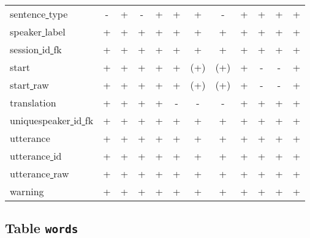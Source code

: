 \documentclass[a4paper, 11pt]{book}
\newcommand{\und}{\underline{{ }}\hspace{0.2mm}}	%
\begin{document}
\begin{longtable}{lccccccccccc}
	sentence\und type 			&  - 		& + 	& -  		& +  		 & + 	  & +  		& - 	 & +  		& + 	  & + 	 & +  \\
	speaker\und label 			&  + 		& + 	& +  		& +  		 & + 	  & +  		& + 	 & +  		& + 	  & + 	 & +  \\
	session\und id\und fk	 	&  + 		& + 	& +  		& +  		 & + 	  & +  		& + 	 & +  		& + 	  & + 	 & +  \\
	start		 				&  + 		& + 	& +  		& +  		 & + 	  & (+)  	& (+) 	 & +  		& - 	  & - 	 & +  \\
	start\und raw 				&  + 		& + 	& +  		& +  		 & + 	  & (+) 	& (+) 	 & +  		& - 	  & - 	 & +  \\
	translation					&  + 		& + 	& + 		& +  		 & - 	  & -  		& - 	 & +  		& + 	  & + 	 & +  \\
	uniquespeaker\und id\und fk &  + 		& + 	& +  		& +  		 & + 	  & +  		& + 	 & +  		& + 	  & + 	 & +  \\
	utterance		 			&  + 		& + 	& +  		& +  		 & + 	  & +  		& + 	 & +  		& + 	  & + 	 & +  \\
	utterance\und id 			&  + 		& + 	& +  		& +  		 & + 	  & +  		& + 	 & +  		& + 	  & + 	 & +  \\
	utterance\und raw 			&  + 		& + 	& +  		& +  		 & + 	  & +  		& + 	 & +  		& + 	  & + 	 & +  \\
	warning 					&  + 		& + 	& + 		& + 		 & + 	  & + 		& + 	 & + 		& + 	  & + 	 & +  \\
\end{longtable}

\subsection{Table \texttt{words}}
\label{subsec:Table words}
\end{document}
